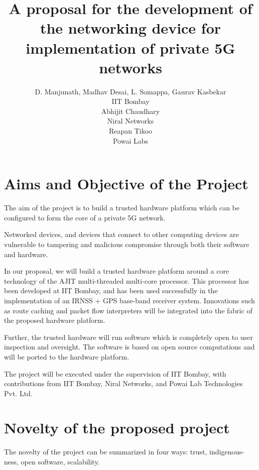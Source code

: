 \documentclass{article}
\title{A proposal for the development of the networking device  for implementation of  private 5G networks}
\author{D. Manjunath, Madhav Desai,  L. Somappa, Gaurav Kasbekar\\ IIT Bombay\\ Abhijit Chaudhary \\ Niral Networks \\ Reapan Tikoo \\ Powai Labs}
\begin{document}
\maketitle

\section{Aims and Objective of the Project}

	The aim of the project is to build a trusted hardware platform
	which can be configured to form the core of a private 5G network.

	Networked devices, and devices that connect to other computing devices are 
	vulnerable to tampering and malicious compromise through both their software and hardware. 

	In our proposal, we will build a trusted hardware platform around 
	a core technology of the AJIT multi-threaded multi-core processor.   
	This processor has been developed at IIT Bombay, and has been used 
	successfully in the implementation of an IRNSS + GPS
	base-band receiver system.   Innovations such as route caching and packet
	flow interpreters will be integrated into the fabric of the proposed hardware
	platform.

	Further, the trusted hardware will run software which is completely open
	to user inspection and oversight.   The software is based on open source
	computations and will be ported to the hardware platform.

	The project will be executed under the supervision of IIT Bombay, 
	with contributions from IIT Bombay, Niral Networks, and Powai Lab
	Technologies Pvt. Ltd.


\section{Novelty of the proposed project}

	The novelty of the project can be summarized in four ways: trust,
	indigenous-ness, open software, scalability.
	
\end{document}
